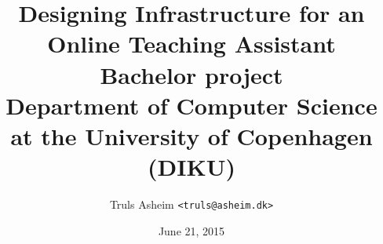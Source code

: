 \documentclass[a4paper,11pt,oneside]{memoir}
\title{Designing Infrastructure for an Online Teaching Assistant\\ \hfill \break Bachelor project\\\large Department of Computer Science at the University of Copenhagen (DIKU)}
\author{Truls Asheim \texttt{<truls@asheim.dk>}}
\date{June 21, 2015}
\theoremstyle{definition}
\begin{document}
\ClearWallPaper


\begin{titlingpage}
\maketitle
\end{titlingpage}



\tableofcontents

\clearpage








\printbibliography

\appendix
\end{document}
